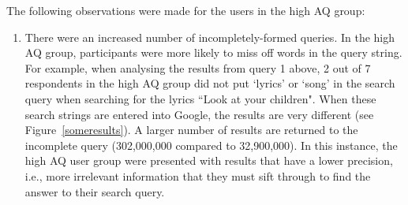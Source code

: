 \documentclass[a4paper, 11pt]{article}
\begin{document}
The following observations were made for the users in the high AQ group:
\begin{enumerate}
\item{There were an increased number of incompletely-formed queries. In the high AQ group, participants were more likely to miss off words in the query string. For example, when analysing the results from query 1 above, 2 out of 7 respondents in the high AQ group did not put `lyrics' or `song' in the search query when searching for the lyrics ``Look at your children". When these search strings are entered into Google, the results are very different (see Figure~\ref{someresults}). A larger number of results are returned to the incomplete query (302,000,000 compared to 32,900,000). In this instance, the high AQ user group were presented with results that have a lower precision, i.e., more irrelevant information that they must sift through to find the answer to their search query.}
\label{incomplete}


\end{enumerate}
\end{document}
